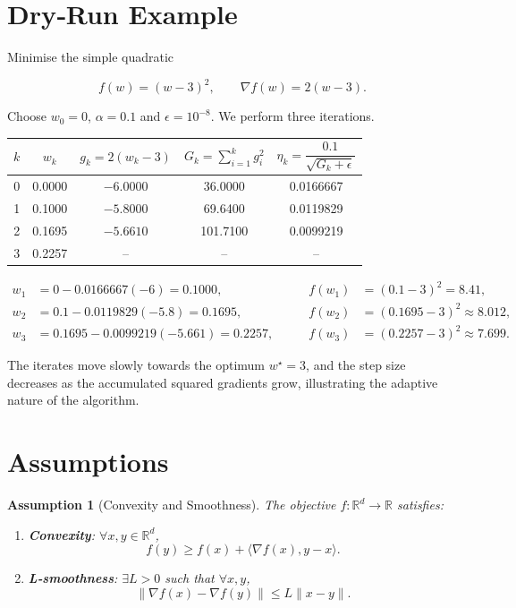 \documentclass{article}
\newtheorem{assumption}{Assumption}
\newcommand{\R}{\mathbb{R}}
\begin{document}
\section*{Dry‑Run Example}
Minimise the simple quadratic  

\[
f(w)=(w-3)^{2},\qquad \nabla f(w)=2(w-3).
\]

Choose \(w_{0}=0\), \(\alpha =0.1\) and \(\epsilon=10^{-8}\).  
We perform three iterations.

\begin{center}
\begin{tabular}{c|c|c|c|c}
\(k\) & \(w_{k}\) & \(g_{k}=2(w_{k}-3)\) & \(G_{k}=\sum_{i=1}^{k}g_{i}^{2}\) & \(\eta_{k}= \dfrac{0.1}{\sqrt{G_{k}+\epsilon}}\) \\
\hline
0 & 0.0000 & \(-6.0000\) & 36.0000 & 0.0166667\\
1 & 0.1000 & \(-5.8000\) & 69.6400 & 0.0119829\\
2 & 0.1695 & \(-5.6610\) &101.7100 & 0.0099219\\
3 & 0.2257 & – & – & –\\
\end{tabular}
\end{center}

\[
\begin{aligned}
w_{1}&=0-0.0166667(-6)=0.1000,\qquad &f(w_{1})&=(0.1-3)^{2}=8.41,\\[2mm]
w_{2}&=0.1-0.0119829(-5.8)=0.1695,\qquad &f(w_{2})&=(0.1695-3)^{2}\approx8.012,\\[2mm]
w_{3}&=0.1695-0.0099219(-5.661)=0.2257,\qquad &f(w_{3})&=(0.2257-3)^{2}\approx7.699 .
\end{aligned}
\]

The iterates move slowly towards the optimum \(w^{\star}=3\), and the step size
decreases as the accumulated squared gradients grow, illustrating the
adaptive nature of the algorithm.

\newpage
\section*{Assumptions}
\begin{assumption}[Convexity and Smoothness]\label{ass:convex}
The objective \(f:\R^{d}\to\R\) satisfies:
\begin{enumerate}
\item[(i)] \textbf{Convexity}: \(\forall x,y\in\R^{d}\),
\[
f(y)\ge f(x)+\langle\nabla f(x),y-x\rangle .
\tag{A1}
\]
\item[(ii)] \textbf{L‑smoothness}: \(\exists L>0\) such that \(\forall x,y\),
\[
\|\nabla f(x)-\nabla f(y)\| \le L\|x-y\| .
\tag{A2}
\]
\end{enumerate}
\end{assumption}
\end{document}
